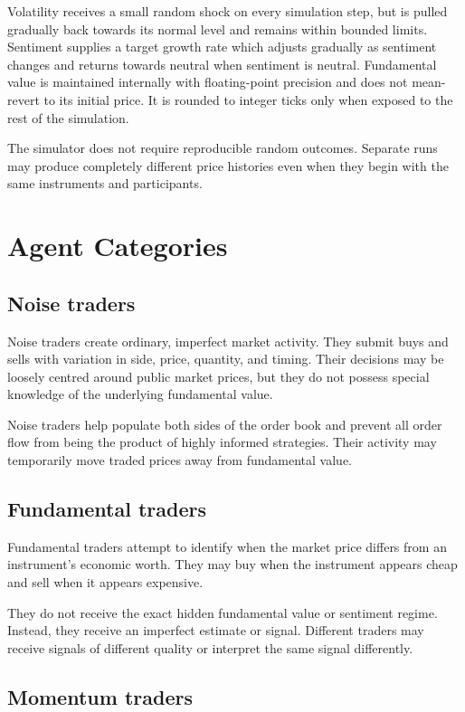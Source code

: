 \documentclass{article}
\begin{document}
Volatility receives a small random shock on every simulation step, but is pulled
gradually back towards its normal level and remains within bounded limits.
Sentiment supplies a target growth rate which adjusts gradually as sentiment
changes and returns towards neutral when sentiment is neutral. Fundamental
value is maintained internally with floating-point precision and does not
mean-revert to its initial price. It is rounded to integer ticks only when
exposed to the rest of the simulation.

The simulator does not require reproducible random outcomes. Separate runs may
produce completely different price histories even when they begin with the
same instruments and participants.

\section{Agent Categories}

\subsection{Noise traders}

Noise traders create ordinary, imperfect market activity. They submit buys and
sells with variation in side, price, quantity, and timing. Their decisions may
be loosely centred around public market prices, but they do not possess special
knowledge of the underlying fundamental value.

Noise traders help populate both sides of the order book and prevent all order
flow from being the product of highly informed strategies. Their activity may
temporarily move traded prices away from fundamental value.

\subsection{Fundamental traders}

Fundamental traders attempt to identify when the market price differs from an
instrument's economic worth. They may buy when the instrument appears cheap
and sell when it appears expensive.

They do not receive the exact hidden fundamental value or sentiment regime.
Instead, they receive an imperfect estimate or signal. Different traders may
receive signals of different quality or interpret the same signal differently.

\subsection{Momentum traders}
\end{document}
